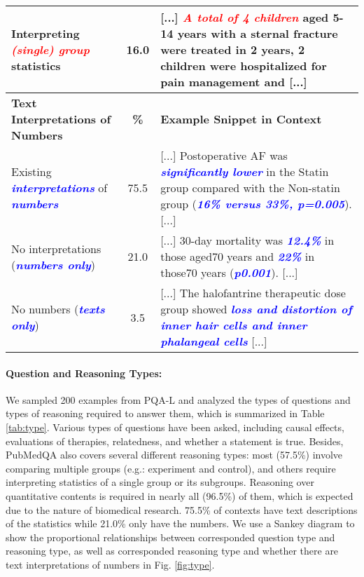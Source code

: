 \documentclass[11pt,a4paper]{article}
\begin{document}
\begin{table*}[!t]
\begin{tabular}{p{4.6cm}cp{9.5cm}}
        \midrule
        {Interpreting \textit{\textbf{\textcolor{red}{(single) group}}} statistics} & 16.0 & [...] \textit{\textbf{\textcolor{red}{A total of 4 children}}} aged 5-14 years with a sternal fracture were treated in 2 years, 2 children were hospitalized for pain management and [...]\\
        \toprule
        \textbf{Text Interpretations of Numbers} & \textbf{\%} & \textbf{Example Snippet in Context} \\ 
        \midrule
        Existing \textbf{\textit{\textcolor{blue}{interpretations}}} of \textbf{\textit{\textcolor{blue}{numbers}}} & 75.5 & [...] Postoperative AF was \textbf{\textit{\textcolor{blue}{significantly lower}}} in the Statin group compared with the Non-statin group (\textbf{\textit{\textcolor{blue}{16\% versus 33\%, p=0.005}}}). [...] \\
        \midrule
        No interpretations (\textbf{\textit{\textcolor{blue}{numbers only}}}) & 21.0 & [...] 30-day mortality was \textbf{\textit{\textcolor{blue}{12.4\%}}} in those aged70 years and \textbf{\textit{\textcolor{blue}{22\%}}} in those70 years (\textbf{\textit{\textcolor{blue}{p0.001}}}). [...] \\
        \midrule
        No numbers (\textbf{\textit{\textcolor{blue}{texts only}}}) & 3.5 &  [...] The halofantrine therapeutic dose group showed \textbf{\textit{\textcolor{blue}{loss and distortion of inner hair cells and inner phalangeal cells}}} [...] \\
        \bottomrule
    \end{tabular}
    \vskip -0.15cm
    \caption{Summary of PubMedQA question types, reasoning types and whether there are text descriptions of the statistics in context. Colored texts are matched key phrases (sentences) between types and examples.
    }
    \label{tab:type}
    \vspace{-0.5em}
\end{table*}


\paragraph{Question and Reasoning Types:} We sampled 200 examples from PQA-L and analyzed the types of questions and types of reasoning required to answer them, which is summarized in Table \ref{tab:type}. Various types of questions have been asked, including causal effects, evaluations of therapies, relatedness, and whether a statement is true. Besides, PubMedQA also covers several different reasoning types: most (57.5\%) involve comparing multiple groups (e.g.: experiment and control), and others require interpreting statistics of a single group or its subgroups. Reasoning over quantitative contents is required in nearly all (96.5\%) of them, which is expected due to the nature of biomedical research. 75.5\% of contexts have text descriptions of the statistics while 21.0\% only have the numbers. We use a Sankey diagram to show the proportional relationships between corresponded question type and reasoning type, as well as corresponded reasoning type and whether there are text interpretations of numbers in Fig. \ref{fig:type}.
\end{document}
